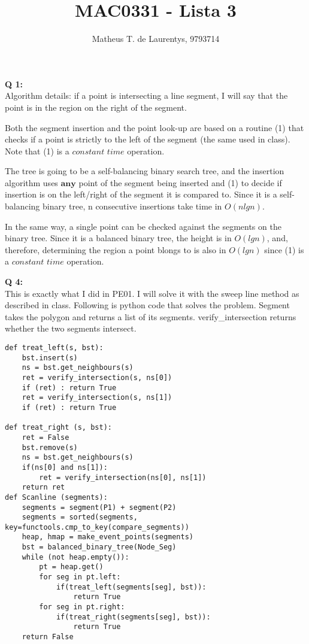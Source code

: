 \documentclass[]{article}
\title{\vspace{-4.0cm}MAC0331 - Lista 3}
\author{Matheus T. de Laurentys, 9793714}
\begin{document}
	\maketitle
	\noindent
	\textbf{Q 1:} \\
	Algorithm details: if a point is intersecting a line segment, I will say that the point is in the region on the right of the segment.
	
	Both the segment insertion and the point look-up are based on a routine (1) that checks if a point is strictly to the left of the segment (the same used in class). Note that (1) is a $\textit{constant time}$ operation.
	
	The tree is going to be a self-balancing binary search tree, and the insertion algorithm uses $\textbf{any}$ point of the segment being inserted and (1) to decide if insertion is on the left/right of the segment it is compared to. Since it is a self-balancing binary tree, n consecutive insertions take time in $O(nlgn)$.
	
	In the same way, a single point can be checked against the segments on the binary tree. Since it is a balanced binary tree, the height is in $O(lgn)$, and, therefore, determining the region a point blongs to is also in $O(lgn)$ since (1) is a $\textit{constant time}$ operation.
	
	\textbf{Q 4:} \\
	This is exactly what I did in PE01. I will solve it with the sweep line method as described in class. Following is python code that solves the problem. Segment takes the polygon and returns a list of its segments. verify\_intersection returns whether the two segments intersect.
	
		\begin{lstlisting}
def treat_left(s, bst):
	bst.insert(s)
	ns = bst.get_neighbours(s)
	ret = verify_intersection(s, ns[0])
	if (ret) : return True
	ret = verify_intersection(s, ns[1])
	if (ret) : return True
	
def treat_right (s, bst):
	ret = False
	bst.remove(s)
	ns = bst.get_neighbours(s)
	if(ns[0] and ns[1]):
		ret = verify_intersection(ns[0], ns[1])
	return ret
def Scanline (segments):
	segments = segment(P1) + segment(P2)
	segments = sorted(segments, key=functools.cmp_to_key(compare_segments))
	heap, hmap = make_event_points(segments)
	bst = balanced_binary_tree(Node_Seg)
	while (not heap.empty()):
		pt = heap.get()
		for seg in pt.left:
			if(treat_left(segments[seg], bst)):
				return True
		for seg in pt.right:
			if(treat_right(segments[seg], bst)):
				return True
	return False
	\end{lstlisting}
	
\end{document}
